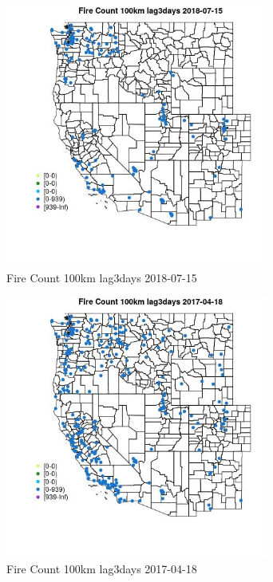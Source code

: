 \begin{figure} 
\centering  
\includegraphics[width=0.77\textwidth]{Code_Outputs/Report_ML_input_PM25_Step4_part_e_de_duplicated_aves_compiled_2019-05-20wNAs_MapObsFire_Count_100km_lag3days2018-07-15.jpg} 
\caption{\label{fig:Report_ML_input_PM25_Step4_part_e_de_duplicated_aves_compiled_2019-05-20wNAsMapObsFire_Count_100km_lag3days2018-07-15}Fire Count 100km lag3days 2018-07-15} 
\end{figure} 
 

\begin{figure} 
\centering  
\includegraphics[width=0.77\textwidth]{Code_Outputs/Report_ML_input_PM25_Step4_part_e_de_duplicated_aves_compiled_2019-05-20wNAs_MapObsFire_Count_100km_lag3days2017-04-18.jpg} 
\caption{\label{fig:Report_ML_input_PM25_Step4_part_e_de_duplicated_aves_compiled_2019-05-20wNAsMapObsFire_Count_100km_lag3days2017-04-18}Fire Count 100km lag3days 2017-04-18} 
\end{figure} 
 

